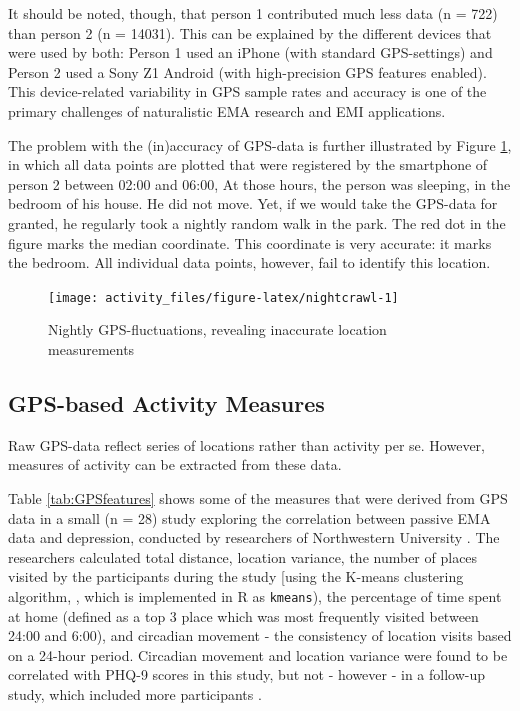\documentclass[]{book}
\begin{document}
It should be noted, though, that person 1 contributed much less data (n
= 722) than person 2 (n = 14031). This can be explained by the different
devices that were used by both: Person 1 used an iPhone (with standard
GPS-settings) and Person 2 used a Sony Z1 Android (with high-precision
GPS features enabled). This device-related variability in GPS sample
rates and accuracy is one of the primary challenges of naturalistic EMA
research and EMI applications.

The problem with the (in)accuracy of GPS-data is further illustrated by
Figure \ref{fig:nightcrawl}, in which all data points are plotted that
were registered by the smartphone of person 2 between 02:00 and 06:00,
At those hours, the person was sleeping, in the bedroom of his house. He
did not move. Yet, if we would take the GPS-data for granted, he
regularly took a nightly random walk in the park. The red dot in the
figure marks the median coordinate. This coordinate is very accurate: it
marks the bedroom. All individual data points, however, fail to identify
this location.

\begin{figure}

{\centering \texttt{[image: activity\_files/figure-latex/nightcrawl-1]} 

}

\caption{Nightly GPS-fluctuations, revealing inaccurate location measurements}\label{fig:nightcrawl}
\end{figure}

\subsection{GPS-based Activity
Measures}\label{gps-based-activity-measures}

Raw GPS-data reflect series of locations rather than activity per se.
However, measures of activity can be extracted from these data.

Table \ref{tab:GPSfeatures} shows some of the measures that were derived
from GPS data in a small (n = 28) study exploring the correlation
between passive EMA data and depression, conducted by researchers of
Northwestern University \citep{Saeb2015}. The researchers calculated
total distance, location variance, the number of places visited by the
participants during the study {[}using the K-means clustering algorithm,
\citet{Hartigan1979}, which is implemented in R as \texttt{kmeans}), the
percentage of time spent at home (defined as a top 3 place which was
most frequently visited between 24:00 and 6:00), and circadian movement
- the consistency of location visits based on a 24-hour period.
Circadian movement and location variance were found to be correlated
with PHQ-9 scores in this study, but not - however - in a follow-up
study, which included more participants \citep{Saeb2017}.
\end{document}

